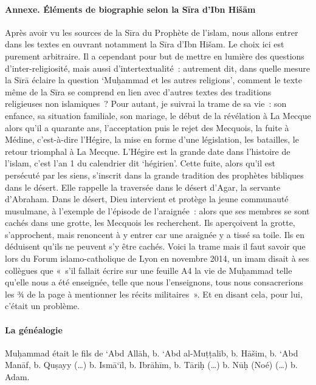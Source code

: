\paragraph{Annexe. Éléments de biographie selon la Sīra d'Ibn
Hišām}

Après avoir vu les sources de la Sīra du Prophète de l'islam, nous
allons entrer dans les textes en ouvrant notamment la Sīra d'Ibn Hišam.
Le choix ici est purement arbitraire. Il a cependant pour but de mettre
en lumière des questions d'inter-religiosité, mais aussi
d'intertextualité~: autrement dit, dans quelle mesure la Sīrā éclaire la
question `Muḥammad et les autres religions', comment le texte même de la
Sīra se comprend en lien avec d'autres textes des traditions religieuses
non islamiques~? Pour autant, je suivrai la trame de sa vie~: son
enfance, sa situation familiale, son mariage, le début de la révélation
à La Mecque alors qu'il a quarante ans, l'acceptation puis le rejet des
Mecquois, la fuite à Médine, c'est-à-dire l'Hégire, la mise en forme
d'une législation, les batailles, le retour triomphal à La Mecque.
L'Hégire est la grande date dans l'histoire de l'islam, c'est l'an 1 du
calendrier dit `hégirien'. Cette fuite, alors qu'il est persécuté par
les siens, s'inscrit dans la grande tradition des prophètes bibliques
dans le désert. Elle rappelle la traversée dans le désert d'Agar, la
servante d'Abraham. Dans le désert, Dieu intervient et protège la jeune
communauté musulmane, à l'exemple de l'épisode de l'araignée~: alors que
ses membres se sont cachés dans une grotte, les Mecquois les
recherchent. Ils aperçoivent la grotte, s'approchent, mais renoncent à y
entrer car une araignée y a tissé sa toile. Ils en déduisent qu'ils ne
peuvent s'y être cachés. Voici la trame mais il faut savoir que lors du
Forum islamo-catholique de Lyon en novembre 2014, un imam disait à ses
collègues que «~s'il fallait écrire sur une feuille A4 la vie de
Muḥammad telle qu'elle nous a été enseignée, telle que nous
l'enseignons, tous nous consacrerions les ¾ de la page à mentionner les
récits militaires~». Et en disant cela, pour lui, c'était un problème.


\paragraph{La généalogie
}

Muḥammad était le fils de `Abd Allāh, b. `Abd al-Muṭṭalib, b. Hāšim, b.
`Abd Manāf, b. Quṣayy (\ldots) b. Ismā`īl, b. Ibrāhīm, b. Tāriḥ (\ldots)
b. Nūḥ (Noé) (\ldots) b. Adam.

